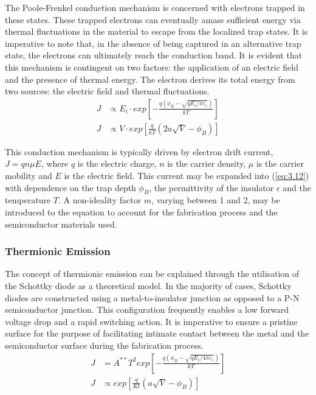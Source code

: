 \noindent The Poole-Frenkel conduction mechanism is concerned with electrons trapped in these states. These trapped electrons can eventually amass sufficient energy via thermal fluctuations in the material to escape from the localized trap states. It is imperative to note that, in the absence of being captured in an alternative trap state, the electrons can ultimately reach the conduction band. It is evident that this mechanism is contingent on two factors: the application of an electric field and the presence of thermal energy. The electron derives its total energy from two sources: the electric field and thermal fluctuations.
\begin{align}
    J &\propto E_i \cdot exp \left[ -\frac{q(\phi _{B} - \sqrt{qE_i/\pi \varepsilon _i} )}{kT} \right] \label{eq:3.12} \\
    J &\propto V \cdot exp \left[ \frac{q}{kT} \left( 2a\sqrt{V} - \phi _{B} \right) \right] \label{eq:3.13} 
\end{align}

\noindent This conduction mechanism is typically driven by electron drift current, $J=qn\mu E$, where $q$ is the electric charge, $n$ is the carrier density, $\mu$ is the carrier mobility and $E$ is the electric field. This current may be expanded into (\ref{eq:3.12}) with dependence on the trap depth $\phi_B$, the permittivity of the insulator $\epsilon$ and the temperature $T$. A non-ideality factor $m$, varying between 1 and 2, may be introduced to the equation to account for the fabrication process and the semiconductor materials used.

\subsubsection[Thermionic Emission]{Thermionic Emission}

The concept of thermionic emission can be explained through the utilisation of the Schottky diode as a theoretical model. In the majority of cases, Schottky diodes are constructed using a metal-to-insulator junction as opposed to a P-N semiconductor junction. This configuration frequently enables a low forward voltage drop and a rapid switching action. It is imperative to ensure a pristine surface for the purpose of facilitating intimate contact between the metal and the semiconductor surface during the fabrication process.
\begin{align}
    J &= A^{**}T^2exp \left[ -\frac{q(\phi _{B} - \sqrt{qE_i/4\pi \varepsilon _i} )}{kT} \right] \label{eq:3.14} \\
    J &\propto exp \left[ \frac{q}{Kt} \left( a\sqrt{V} - \phi _{B} \right) \right] \label{eq:3.15}
\end{align}

